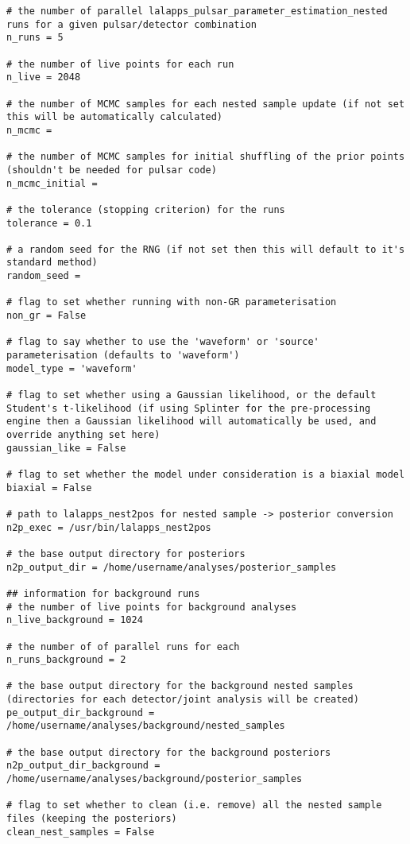 \begin{lstlisting}[frame=single,basicstyle=\tiny\ttfamily]
# the number of parallel lalapps_pulsar_parameter_estimation_nested runs for a given pulsar/detector combination
n_runs = 5

# the number of live points for each run
n_live = 2048

# the number of MCMC samples for each nested sample update (if not set this will be automatically calculated)
n_mcmc =

# the number of MCMC samples for initial shuffling of the prior points (shouldn't be needed for pulsar code)
n_mcmc_initial =

# the tolerance (stopping criterion) for the runs
tolerance = 0.1

# a random seed for the RNG (if not set then this will default to it's standard method)
random_seed =

# flag to set whether running with non-GR parameterisation
non_gr = False

# flag to say whether to use the 'waveform' or 'source' parameterisation (defaults to 'waveform')
model_type = 'waveform'

# flag to set whether using a Gaussian likelihood, or the default Student's t-likelihood (if using Splinter for the pre-processing engine then a Gaussian likelihood will automatically be used, and override anything set here)
gaussian_like = False

# flag to set whether the model under consideration is a biaxial model
biaxial = False

# path to lalapps_nest2pos for nested sample -> posterior conversion
n2p_exec = /usr/bin/lalapps_nest2pos

# the base output directory for posteriors
n2p_output_dir = /home/username/analyses/posterior_samples

## information for background runs
# the number of live points for background analyses
n_live_background = 1024

# the number of of parallel runs for each
n_runs_background = 2

# the base output directory for the background nested samples (directories for each detector/joint analysis will be created)
pe_output_dir_background = /home/username/analyses/background/nested_samples

# the base output directory for the background posteriors
n2p_output_dir_background = /home/username/analyses/background/posterior_samples

# flag to set whether to clean (i.e. remove) all the nested sample files (keeping the posteriors)
clean_nest_samples = False


\end{lstlisting}
